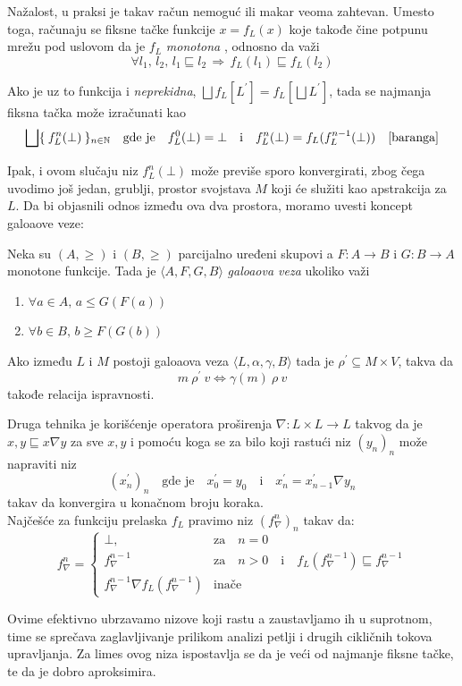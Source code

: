 Nažalost, u praksi je takav račun nemoguć ili makar veoma zahtevan. Umesto toga, računaju se fiksne tačke funkcije $x = f_{L}(x)$ koje takođe čine potpunu mrežu pod uslovom da je $f_{L}$ \emph{monotona} \cite{tarski}, odnosno da važi $$\forall l_{1},\, l_{2},\, l_{1} \sqsubseteq l_{2} \, \Rightarrow \, f_{L}(l_1) \sqsubseteq f_{L}(l_2)$$ 

 Ako je uz to funkcija i \emph{neprekidna}, $\bigsqcup f_{L}[L^{\prime}] = f_{L}[\bigsqcup L^{\prime}]$, tada se najmanja fiksna tačka može izračunati kao $$\bigsqcup \{ \: f^{n}_{L}(\bot)\: \}_{n \in \mathbb{N}} \quad \text{gde je} \quad f^{0}_{L}(\bot) = \bot \quad \text{i} \quad f^{n}_{L}(\bot) = f_{L}(f^{n-1}_{L}(\bot)) \quad \cite{baranga}$$

Ipak, i ovom slučaju niz $f^{n}_{L} ( \bot )$ može previše sporo konvergirati, zbog čega uvodimo još jedan, grublji, prostor svojstava $M$ koji će služiti kao apstrakcija za $L$. Da bi objasnili odnos između ova dva prostora, moramo uvesti koncept galoaove veze:
\begin{definicija}
Neka su $(A, \geqslant)$ i $(B, \geqslant)$ parcijalno uređeni skupovi a $F : A \rightarrow B$ i $G : B \rightarrow A$ monotone funkcije. Tada je $\langle A, 	F, G, B \rangle$ \emph{galoaova veza} ukoliko važi 
\begin{enumerate}
\item $\forall a \in A, \, a \leqslant G (F (a))$ 
\item $\forall b \in B, \, b \geqslant F (G (b))$
\end{enumerate}
\end{definicija} 

\begin{teorema}
Ako između $L$ i $M$ postoji galoaova veza $\langle L, \alpha, \gamma, B \rangle$ tada je $\rho^{\prime} \subseteq M \times V$, takva da $$m\: \rho^{\prime}\: v \iff \gamma (m)\: \rho \: v$$ takođe relacija ispravnosti.
\end{teorema}

Druga tehnika je korišćenje operatora proširenja $\nabla : L \times L \rightarrow L$ takvog da je $x, y \sqsubseteq x \nabla y$ za sve $x, y$ i pomoću koga se za bilo koji rastući niz $(y_{n})_{n}$ može napraviti niz $$(x^{\prime}_{n})_{n} \quad \text{gde je} \quad x^{\prime}_{0} = y_{0} \quad \text{i} \quad x^{\prime}_{n} = x^{\prime}_{n-1} \nabla y_{n} $$ takav da konvergira u konačnom broju koraka. \\

Najčešće za funkciju prelaska $f_{L}$ pravimo niz $(f^{n}_{\nabla})_{n}$ takav da:
$$
f^{n}_{\nabla} = 
\begin{cases}
\bot,            								  & 	\text{za} \quad n = 0 \\
f^{n-1}_{\nabla} 							      & \text{za} \quad n > 0 \quad \text{i} \quad f_{L}(f^{n-1}_{\nabla}) \sqsubseteq f^{n-1}_{\nabla} \\
f^{n-1}_{\nabla} \nabla f_{L}(f^{n-1}_{\nabla})  & \text{inače}
\end{cases}
$$

Ovime efektivno ubrzavamo nizove koji rastu a zaustavljamo ih u suprotnom, time se sprečava zaglavljivanje prilikom analizi petlji i drugih cikličnih tokova upravljanja. Za limes ovog niza ispostavlja se da je veći od najmanje fiksne tačke, te da je dobro aproksimira. 